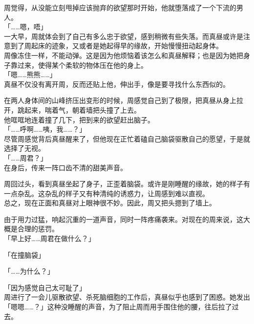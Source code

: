 周觉得，从没能立刻甩掉应该抛弃的欲望那时开始，他就堕落成了一个下流的男人。\\

「……嗯，唔」\\

一大早，周就体会到了自己有多么忠于欲望，感到稍微有些失落。而真昼或许是注意到了周起床的迹象，又或者是她起得早的缘故，开始慢慢扭动起身体。\\

周像冻住一样，不能动弹。这是因为他烦恼着该怎么和真昼解释；也是因为她把身子靠过来，使得某个柔软的物体压在他的身上。\\

「嗯……熊熊……」\\

真昼不仅没有离开周，反而还贴上他，伸出手，像是要寻找什么东西似的。

在两人身体间的山峰挤压出变形的时候，周感觉自己到了极限，把真昼从身上拉开，跳起来，喘着气，朝着墙把头撞了上去。\\

他哐哐地连着撞了几下，把到来的欲望赶出脑子。\\

「……呼啊……咦，我……？」\\

尽管周感觉背后真昼醒来了，但他现在正忙着磕自己脑袋驱散自己的愿望，于是就选择了无视。\\

「……周君？」\\

在身后，传来一阵口齿不清的甜美声音。

周回过头，看到真昼坐起了身子，正歪着脑袋。或许是刚睡醒的缘故，她的样子有一点杂乱。这杂乱的样子又有种清纯的诱惑力，让周感到难以直视。\\

总之，现在正面和真昼对上眼神很不妙。因此，周又把头摁到了墙上。

由于用力过猛，响起沉重的一道声音，同时一阵疼痛袭来。对现在的周来说，这大概是合理的惩罚。\\

「早上好……周君在做什么？」

「在撞脑袋」

「……为什么？」

「因为感觉自己太可耻了」\\

周进行了一会儿驱散欲望、杀死脑细胞的工作后，真昼似乎也感到了困惑。她发出「嗯嗯……？」这种没睡醒的声音，为了阻止周而用手围住他的腰，往后拉了过去。

